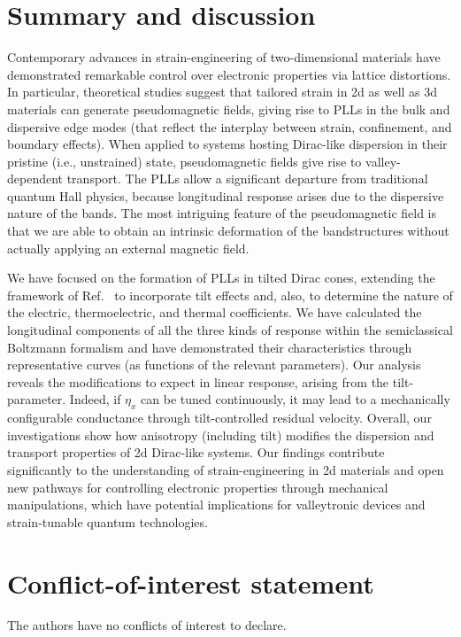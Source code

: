 \documentclass[aps,prb, onecolumn, nofootinbib, citeautoscript,10pt]{revtex4-2}
\newcommand{\red}[1]{{\color{red}#1}}
\begin{document}
\section{Summary and discussion}
\label{secsum}


Contemporary advances in strain-engineering of two-dimensional materials have demonstrated remarkable control over electronic properties via lattice distortions. In particular, theoretical studies suggest that tailored strain in 2d as well as 3d materials can generate pseudomagnetic fields, giving rise to PLLs in the bulk and dispersive edge modes (that reflect the interplay between strain, confinement, and boundary effects). When applied to systems hosting Dirac-like dispersion in their pristine (i.e., unstrained) state, pseudomagnetic fields give rise to valley-dependent transport. The PLLs allow a significant departure from traditional quantum Hall physics, because longitudinal response arises due to the dispersive nature of the bands. The most intriguing feature of the pseudomagnetic field is that we are able to obtain an intrinsic deformation of the bandstructures without actually applying an external magnetic field.


We have focused on the formation of PLLs in tilted Dirac cones, extending the framework of Ref.~\cite{strained-dirac-franz} to incorporate tilt effects and, also, to determine the nature of the electric, thermoelectric, and thermal coefficients. We have calculated the longitudinal components of all the three kinds of response within the semiclassical Boltzmann formalism and have demonstrated their characteristics through representative curves (as functions of the relevant parameters). Our analysis reveals the modifications to expect in linear response, arising from the tilt-parameter. Indeed, if $\eta_x$ can be tuned continuously, it may lead to a mechanically configurable conductance through tilt-controlled residual velocity. Overall, our investigations show how anisotropy (including tilt) \red{modifies the dispersion} and transport properties of 2d Dirac-like systems. Our findings contribute significantly to the understanding of strain-engineering in 2d materials and open new pathways for controlling electronic properties through mechanical manipulations, which have potential implications for valleytronic devices and strain-tunable quantum technologies.


\section*{Conflict-of-interest statement}
The authors have no conflicts of interest to declare.
\end{document}

